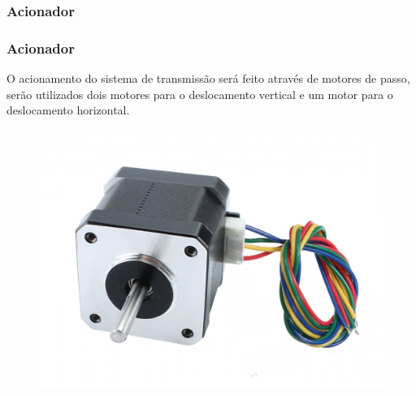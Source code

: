 \subsubsection{Acionador}

\begin{frame}
\frametitle{Acionador}

O acionamento do sistema de transmissão será feito através de motores de passo, serão utilizados dois motores para o deslocamento vertical e um motor para o deslocamento horizontal.  

\begin{figure}
\centering
\includegraphics[scale = 0.1]{figuras/motordepassoex}
\end{figure}
    
\end{frame}
